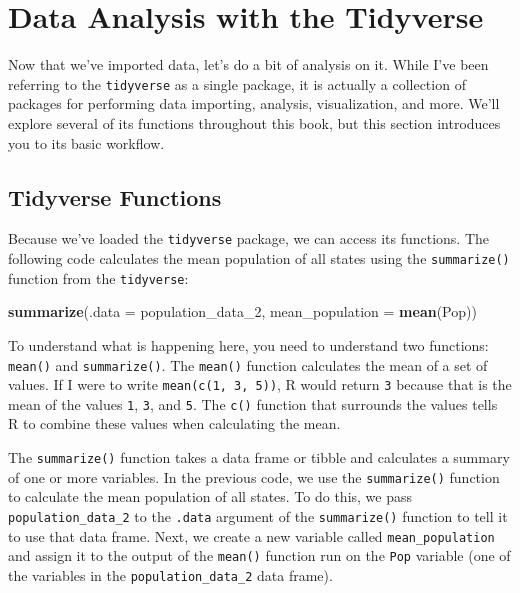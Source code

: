 \documentclass[
]{book}
\newenvironment{Shaded}{\begin{snugshade}}{\end{snugshade}}
\newcommand{\AttributeTok}[1]{\textcolor[rgb]{0.13,0.29,0.53}{#1}}
\newcommand{\FunctionTok}[1]{\textcolor[rgb]{0.13,0.29,0.53}{\textbf{#1}}}
\newcommand{\NormalTok}[1]{#1}
\begin{document}
\hypertarget{data-analysis-with-the-tidyverse}{%
\section*{Data Analysis with the Tidyverse}\label{data-analysis-with-the-tidyverse}}

Now that we've imported data, let's do a bit of analysis on it. While I've been referring to the \texttt{tidyverse} as a single package, it is actually a collection of packages for performing data importing, analysis, visualization, and more. We'll explore several of its functions throughout this book, but this section introduces you to its basic workflow.

\hypertarget{tidyverse-functions}{%
\subsection*{Tidyverse Functions}\label{tidyverse-functions}}

Because we've loaded the \texttt{tidyverse} package, we can access its functions. The following code calculates the mean population of all states using the \texttt{summarize()} function from the \texttt{tidyverse}:

\begin{Shaded}
\begin{Highlighting}[]
\FunctionTok{summarize}\NormalTok{(}\AttributeTok{.data =}\NormalTok{ population\_data\_2,}
          \AttributeTok{mean\_population =} \FunctionTok{mean}\NormalTok{(Pop))}
\end{Highlighting}
\end{Shaded}

To understand what is happening here, you need to understand two functions: \texttt{mean()} and \texttt{summarize()}. The \texttt{mean()} function calculates the mean of a set of values. If I were to write \texttt{mean(c(1,\ 3,\ 5))}, R would return \texttt{3} because that is the mean of the values \texttt{1}, \texttt{3}, and \texttt{5}. The \texttt{c()} function that surrounds the values tells R to combine these values when calculating the mean.

The \texttt{summarize()} function takes a data frame or tibble and calculates a summary of one or more variables. In the previous code, we use the \texttt{summarize()} function to calculate the mean population of all states. To do this, we pass \texttt{population\_data\_2} to the \texttt{.data} argument of the \texttt{summarize()} function to tell it to use that data frame. Next, we create a new variable called \texttt{mean\_population} and assign it to the output of the \texttt{mean()} function run on the \texttt{Pop} variable (one of the variables in the \texttt{population\_data\_2} data frame).
\end{document}
